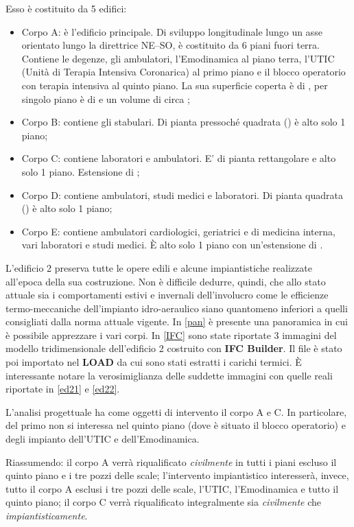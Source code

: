 Esso è costituito da 5 edifici:
\begin{itemize}
	\item Corpo A: è l'edificio principale. Di sviluppo longitudinale lungo un asse orientato lungo la direttrice NE--SO, è costituito da 6 piani fuori terra. Contiene le degenze, gli ambulatori, l'Emodinamica al piano terra, l'UTIC (Unità di Terapia Intensiva Coronarica) al primo piano e il blocco operatorio con terapia intensiva al quinto piano. La sua superficie coperta è di , per singolo piano è di  e un volume di circa ;
	\item Corpo B: contiene gli stabulari. Di pianta pressoché quadrata () è alto solo 1 piano; 
	\item Corpo C: contiene laboratori e ambulatori. E' di pianta rettangolare e alto solo 1 piano. Estensione di ;
	\item Corpo D: contiene ambulatori, studi medici e laboratori. Di pianta quadrata () è alto solo 1 piano; 
	\item Corpo E: contiene ambulatori cardiologici, geriatrici e di medicina interna, vari laboratori e studi medici. È alto solo 1 piano con un'estensione di .
\end{itemize}

L'edificio 2 preserva tutte le opere edili e alcune impiantistiche realizzate all'epoca della sua costruzione. Non è difficile dedurre, quindi, che allo stato attuale sia i comportamenti estivi e invernali dell'involucro come le efficienze termo-meccaniche dell'impianto idro-aeraulico siano quantomeno inferiori a quelli consigliati dalla norma attuale vigente. In \vref{pan} è presente una panoramica in cui è possibile apprezzare i vari corpi. In \vref{IFC} sono state riportate \num{3} immagini del modello tridimensionale dell'edificio 2 costruito con \textbf{IFC Builder}. Il file è stato poi importato nel \textbf{LOAD} da cui sono stati estratti i carichi termici. È interessante notare la verosimiglianza delle suddette immagini con quelle reali riportate in \vref{ed21} e \ref{ed22}.

L'analisi progettuale ha come oggetti di intervento il corpo A e C. In particolare, del primo non si interessa nel quinto piano (dove è situato il blocco operatorio) e degli impianto dell'UTIC e dell'Emodinamica.

Riassumendo: il corpo A verrà riqualificato \emph{civilmente} in tutti i piani escluso il quinto piano e i tre pozzi delle scale; l'intervento impiantistico interesserà, invece, tutto il corpo A esclusi i tre pozzi delle scale, l'UTIC, l'Emodinamica e tutto il quinto piano; il corpo C verrà riqualificato integralmente sia \emph{civilmente} che \emph{impiantisticamente}. 

